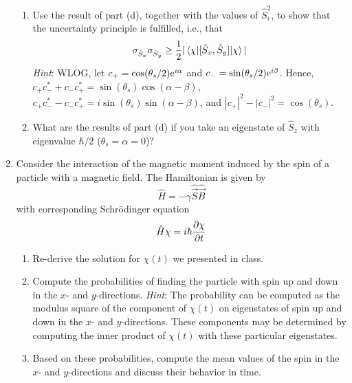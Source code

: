 \documentclass[../psets.tex]{subfiles}
\begin{document}
\begin{enumerate}
\begin{enumerate}
        \item Use the result of part (d), together with the values of $\hat{S}_i^2$, to show that the uncertainty principle is fulfilled, i.e., that
        \begin{equation}
            \sigma_{\hat{S}_x}\sigma_{\hat{S}_y} \geq \frac{1}{2}|\ev{[\hat{S}_x,\hat{S}_y]}{\chi}|
        \end{equation}
        \emph{Hint}: WLOG, let $c_+=\cos(\theta_s/2)\e[i\alpha]$ and $c_-=\sin(\theta_s/2)\e[i\beta]$. Hence, $c_+c_-^*+c_-c_+^*=\sin(\theta_s)\cos(\alpha-\beta)$, $c_+c_-^*-c_-c_+^*=i\sin(\theta_s)\sin(\alpha-\beta)$, and $|c_+|^2-|c_-|^2=\cos(\theta_s)$.
        \item What are the results of part (d) if you take an eigenstate of $\hat{S}_z$ with eigenvalue $\hbar/2$ ($\theta_s=\alpha=0$)?
    \end{enumerate}
    \item Consider the interaction of the magnetic moment induced by the spin of a particle with a magnetic field. The Hamiltonian is given by
    \begin{equation}
        \hat{H} = -\gamma\hat{\vec{S}}\hat{\vec{B}}
    \end{equation}
    with corresponding Schr\"{o}dinger equation
    \begin{equation}
        \hat{H}\chi = i\hbar\pdv{\chi}{t}
    \end{equation}
    \begin{enumerate}
        \item Re-derive the solution for $\chi(t)$ we presented in class.
        \item Compute the probabilities of finding the particle with spin up and down in the $x$- and $y$-directions. \emph{Hint}: The probability can be computed as the modulus square of the component of $\chi(t)$ on eigenstates of spin up and down in the $x$- and $y$-directions. These components may be determined by computing the inner product of $\chi(t)$ with these particular eigenstates.
        \item Based on these probabilities, compute the mean values of the spin in the $x$- and $y$-directions and discuss their behavior in time.
    \end{enumerate}
\end{enumerate}
\end{document}

